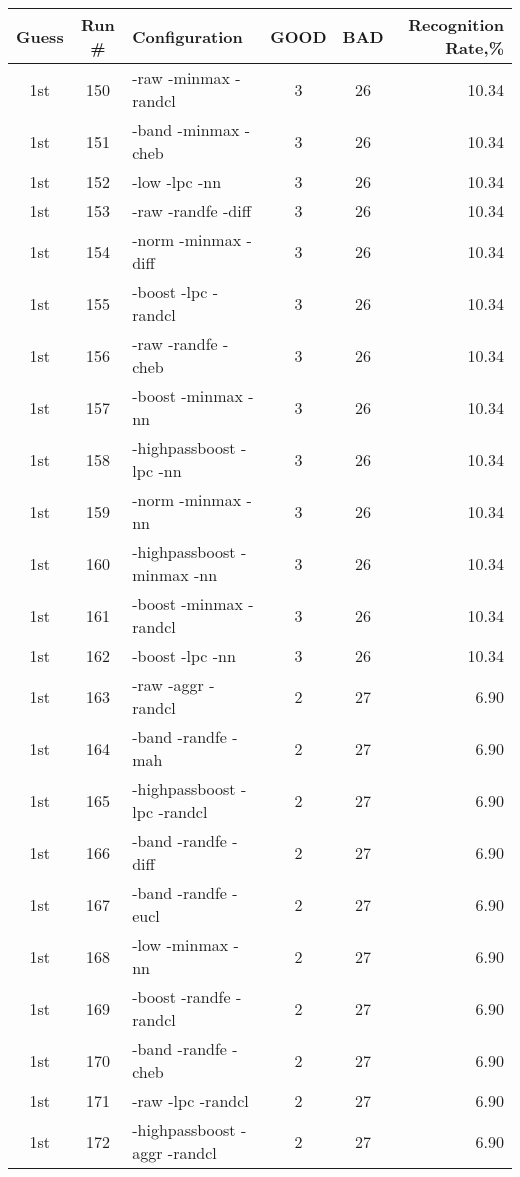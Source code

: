 \begin{table}
\begin{minipage}[b]{\textwidth}
\centering
\begin{tabular}{|c|c|l|c|c|r|} \hline
Guess & Run \# & Configuration & GOOD & BAD & Recognition Rate,\%\\ \hline\hline
1st & 150 & -raw -minmax -randcl  & 3 & 26 & 10.34\\ \hline
1st & 151 & -band -minmax -cheb  & 3 & 26 & 10.34\\ \hline
1st & 152 & -low -lpc -nn  & 3 & 26 & 10.34\\ \hline
1st & 153 & -raw -randfe -diff  & 3 & 26 & 10.34\\ \hline
1st & 154 & -norm -minmax -diff  & 3 & 26 & 10.34\\ \hline
1st & 155 & -boost -lpc -randcl  & 3 & 26 & 10.34\\ \hline
1st & 156 & -raw -randfe -cheb  & 3 & 26 & 10.34\\ \hline
1st & 157 & -boost -minmax -nn  & 3 & 26 & 10.34\\ \hline
1st & 158 & -highpassboost -lpc -nn  & 3 & 26 & 10.34\\ \hline
1st & 159 & -norm -minmax -nn  & 3 & 26 & 10.34\\ \hline
1st & 160 & -highpassboost -minmax -nn  & 3 & 26 & 10.34\\ \hline
1st & 161 & -boost -minmax -randcl  & 3 & 26 & 10.34\\ \hline
1st & 162 & -boost -lpc -nn  & 3 & 26 & 10.34\\ \hline
1st & 163 & -raw -aggr -randcl  & 2 & 27 & 6.90\\ \hline
1st & 164 & -band -randfe -mah  & 2 & 27 & 6.90\\ \hline
1st & 165 & -highpassboost -lpc -randcl  & 2 & 27 & 6.90\\ \hline
1st & 166 & -band -randfe -diff  & 2 & 27 & 6.90\\ \hline
1st & 167 & -band -randfe -eucl  & 2 & 27 & 6.90\\ \hline
1st & 168 & -low -minmax -nn  & 2 & 27 & 6.90\\ \hline
1st & 169 & -boost -randfe -randcl  & 2 & 27 & 6.90\\ \hline
1st & 170 & -band -randfe -cheb  & 2 & 27 & 6.90\\ \hline
1st & 171 & -raw -lpc -randcl  & 2 & 27 & 6.90\\ \hline
1st & 172 & -highpassboost -aggr -randcl  & 2 & 27 & 6.90\\ \hline

\end{tabular}
\end{minipage}
\end{table}
